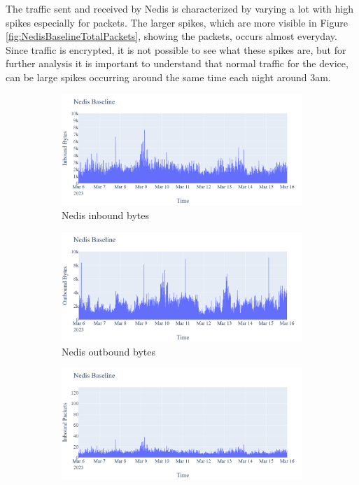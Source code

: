 The traffic sent and received by Nedis is characterized by varying a lot with high spikes especially for packets. The larger spikes, which are more visible in Figure \ref{fig:NedisBaselineTotalPackets}, showing the packets, occurs almost everyday. Since traffic is encrypted, it is not possible to see what these spikes are, but for further analysis it is important to understand that normal traffic for the device, can be large spikes occurring around the same time each night around 3am. 

\begin{figure}[H]
    \centering
    \begin{subfigure}[b]{0.4\textwidth}
        \includegraphics[width=\textwidth]{figures/Nedis_Baseline_InboundBytes.png}
        \caption{Nedis inbound bytes}
    \end{subfigure}
    \begin{subfigure}[b]{0.4\textwidth}
        \includegraphics[width=\textwidth]{figures/Nedis_Baseline_OutboundBytes.png}
        \caption{Nedis outbound bytes}
    \end{subfigure}
    \begin{subfigure}[b]{0.4\textwidth}
        \includegraphics[width=\textwidth]{figures/Nedis_Baseline_InboundPackets.png}

\end{subfigure}
\end{figure}
